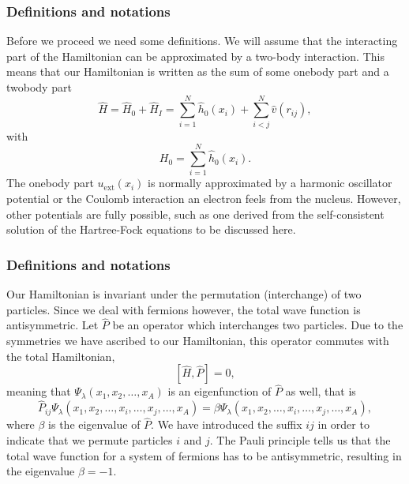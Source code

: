 \documentclass{beamer}
\begin{document}
\begin{frame}
\frametitle{Definitions and notations}

\begin{block}{}
Before we proceed we need some definitions.
We will assume that the interacting part of the Hamiltonian
can be approximated by a two-body interaction.
This means that our Hamiltonian is written as the sum of some onebody part and a twobody part
\begin{equation}
    \hat{H} = \hat{H}_0 + \hat{H}_I 
    = \sum_{i=1}^N \hat{h}_0(x_i) + \sum_{i < j}^N \hat{v}(r_{ij}),
\label{Hnuclei}
\end{equation}
with 
\begin{equation}
  H_0=\sum_{i=1}^N \hat{h}_0(x_i).
\label{hinuclei}
\end{equation}
The onebody part $u_{\mathrm{ext}}(x_i)$ is normally approximated by a harmonic oscillator potential or the Coulomb interaction an electron feels from the nucleus. However, other potentials are fully possible, such as 
one derived from the self-consistent solution of the Hartree-Fock equations to be discussed here.
\end{block}
\end{frame}

\begin{frame}
\frametitle{Definitions and notations}

\begin{block}{}
Our Hamiltonian is invariant under the permutation (interchange) of two particles.
Since we deal with fermions however, the total wave function is antisymmetric.
Let $\hat{P}$ be an operator which interchanges two particles.
Due to the symmetries we have ascribed to our Hamiltonian, this operator commutes with the total Hamiltonian,
\[
[\hat{H},\hat{P}] = 0,
 \]
meaning that $\Psi_{\lambda}(x_1, x_2, \dots , x_A)$ is an eigenfunction of 
$\hat{P}$ as well, that is
\[
\hat{P}_{ij}\Psi_{\lambda}(x_1, x_2, \dots,x_i,\dots,x_j,\dots,x_A)=
\beta\Psi_{\lambda}(x_1, x_2, \dots,x_i,\dots,x_j,\dots,x_A),
\]
where $\beta$ is the eigenvalue of $\hat{P}$. We have introduced the suffix $ij$ in order to indicate that we permute particles $i$ and $j$.
The Pauli principle tells us that the total wave function for a system of fermions
has to be antisymmetric, resulting in the eigenvalue $\beta = -1$.   
\end{block}
\end{frame}
\end{document}
